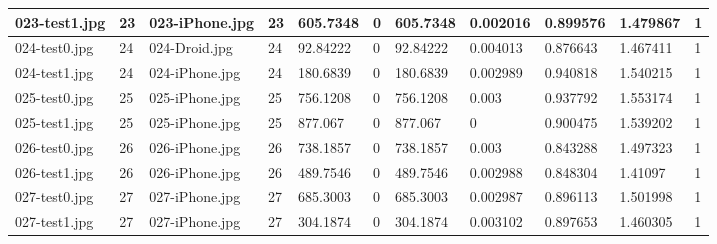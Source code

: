 \begin{landscape}
\begin{longtable}{|p{2cm}|p{1cm}|p{2cm}|p{1cm}|p{2cm}|p{1cm}|p{2cm}|p{2cm}|p{2cm}|p{2cm}|p{1cm}|}
		023-test1.jpg   & 23               & 023-iPhone.jpg        & 23                          & 605.7348              & 0                       & 605.7348                   & 0.002016              & 0.899576              & 1.479867                 & 1                \\ \hline
		024-test0.jpg   & 24               & 024-Droid.jpg         & 24                          & 92.84222              & 0                       & 92.84222                   & 0.004013              & 0.876643              & 1.467411                 & 1                \\ \hline
		024-test1.jpg   & 24               & 024-iPhone.jpg        & 24                          & 180.6839              & 0                       & 180.6839                   & 0.002989              & 0.940818              & 1.540215                 & 1                \\ \hline
		025-test0.jpg   & 25               & 025-iPhone.jpg        & 25                          & 756.1208              & 0                       & 756.1208                   & 0.003                 & 0.937792              & 1.553174                 & 1                \\ \hline
		025-test1.jpg   & 25               & 025-iPhone.jpg        & 25                          & 877.067               & 0                       & 877.067                    & 0                     & 0.900475              & 1.539202                 & 1                \\ \hline
		026-test0.jpg   & 26               & 026-iPhone.jpg        & 26                          & 738.1857              & 0                       & 738.1857                   & 0.003                 & 0.843288              & 1.497323                 & 1                \\ \hline
		026-test1.jpg   & 26               & 026-iPhone.jpg        & 26                          & 489.7546              & 0                       & 489.7546                   & 0.002988              & 0.848304              & 1.41097                  & 1                \\ \hline
		027-test0.jpg   & 27               & 027-iPhone.jpg        & 27                          & 685.3003              & 0                       & 685.3003                   & 0.002987              & 0.896113              & 1.501998                 & 1                \\ \hline
		027-test1.jpg   & 27               & 027-iPhone.jpg        & 27                          & 304.1874              & 0                       & 304.1874                   & 0.003102              & 0.897653              & 1.460305                 & 1                \\ \hline

\end{longtable}
\end{landscape}
